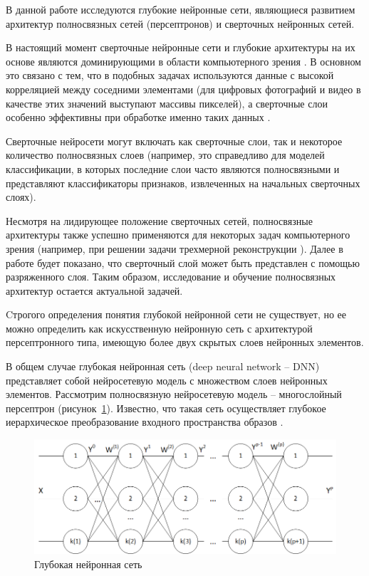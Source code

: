 В данной работе исследуются глубокие нейронные сети, являющиеся развитием архитектур полносвязных сетей (персептронов) и сверточных нейронных сетей.

В настоящий момент сверточные нейронные сети и глубокие архитектуры на их основе являются доминирующими в области компьютерного зрения \cite{LeCun2015}. В основном это связано с тем, что в подобных задачах используются данные с высокой корреляцией между соседними элементами (для цифровых фотографий и видео в качестве этих значений выступают массивы пикселей), а сверточные слои особенно эффективны при обработке именно таких данных \cite{Emmert2020}.

Сверточные нейросети могут включать как сверточные слои, так и некоторое количество полносвязных слоев (например, это справедливо для моделей классификации, в которых последние слои часто являются полносвязными и представляют классификаторы признаков, извлеченных на начальных сверточных слоях). %

Несмотря на лидирующее положение сверточных сетей, полносвязные архитектуры также успешно применяются для некоторых задач компьютерного зрения (например, при решении задачи трехмерной реконструкции \cite{mildenhall2020nerf}). Далее в работе будет показано, что сверточный слой может быть представлен с помощью разряженного слоя. Таким образом, исследование и обучение полносвязных архитектур остается актуальной задачей. 

Cтрогого определения понятия глубокой нейронной сети не существует, но ее можно определить как искусственную нейронную сеть с архитектурой персептронного типа, имеющую более двух скрытых слоев нейронных элементов.

В общем случае глубокая нейронная сеть (deep neural network -- DNN) представляет собой нейросетевую модель с множеством слоев нейронных элементов. Рассмотрим полносвязную нейросетевую модель -- многослойный персептрон (рисунок~\ref{fig:pic1_1}). Известно, что такая сеть осуществляет глубокое иерархическое преобразование входного пространства образов \cite{n5}. 

\begin{figure}[H]
  \centering
  \includegraphics[width=\textwidth]{man-source/images/ch1/pic1-1.png}
  \caption{Глубокая нейронная сеть}
  \label{fig:pic1_1}
\end{figure}

